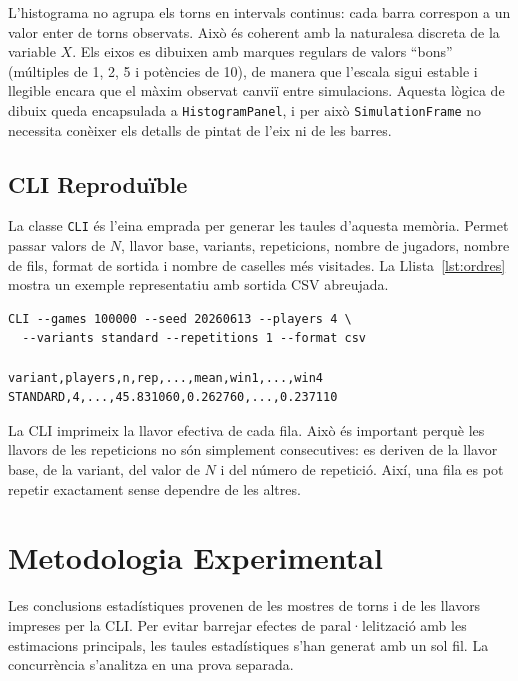 \documentclass[conference,compsoc]{IEEEtran}
\begin{document}
L'histograma no agrupa els torns en intervals continus: cada barra correspon a un
valor enter de torns observats. Això és coherent amb la naturalesa discreta de la
variable $X$. Els eixos es dibuixen amb marques regulars de valors ``bons''
(múltiples de 1, 2, 5 i potències de 10), de manera que l'escala sigui estable i
llegible encara que el màxim observat canviï entre simulacions. Aquesta lògica de
dibuix queda encapsulada a \texttt{HistogramPanel}, i per això \texttt{SimulationFrame}
no necessita conèixer els detalls de pintat de l'eix ni de les barres.

\subsection{CLI Reproduïble}

La classe \texttt{CLI} és l'eina emprada per generar les taules d'aquesta memòria.
Permet passar valors de $N$, llavor base, variants, repeticions, nombre de
jugadors, nombre de fils, format de sortida i nombre de caselles més visitades. La
Llista~\ref{lst:ordres} mostra un exemple representatiu amb sortida CSV abreujada.

\begin{lstlisting}[caption={Exemple d'execució reproduïble de la CLI.},label={lst:ordres}]
CLI --games 100000 --seed 20260613 --players 4 \
  --variants standard --repetitions 1 --format csv

variant,players,n,rep,...,mean,win1,...,win4
STANDARD,4,...,45.831060,0.262760,...,0.237110
\end{lstlisting}

La CLI imprimeix la llavor efectiva de cada fila. Això és important perquè les
llavors de les repeticions no són simplement consecutives: es deriven de la llavor
base, de la variant, del valor de $N$ i del número de repetició. Així, una fila es
pot repetir exactament sense dependre de les altres.

\section{Metodologia Experimental}
\label{sec:experiments}

Les conclusions estadístiques provenen de les mostres de torns i de les llavors
impreses per la CLI. Per evitar barrejar efectes de paral·lelització amb les
estimacions principals, les taules estadístiques s'han generat amb un sol fil. La
concurrència s'analitza en una prova separada.
\end{document}
